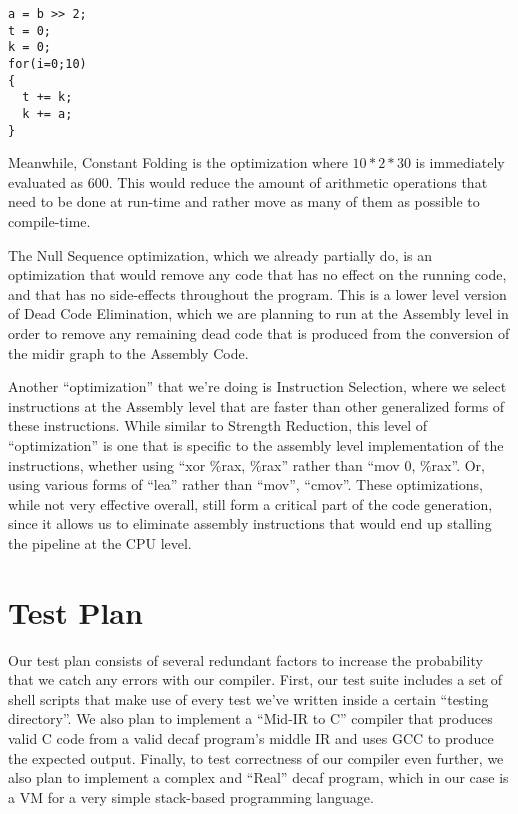 \documentclass[11pt]{article}
\begin{document}
\begin{verbatim}
a = b >> 2;
t = 0;
k = 0;
for(i=0;10)
{
  t += k;
  k += a;
}
\end{verbatim}

Meanwhile, Constant Folding is the optimization where $10*2*30$ is
immediately evaluated as $600$. This would reduce the amount of
arithmetic operations that need to be done at run-time and rather move
as many of them as possible to compile-time.

The Null Sequence optimization, which we already partially do, is an
optimization that would remove any code that has no effect on the
running code, and that has no side-effects throughout the
program. This is a lower level version of Dead Code Elimination, which
we are planning to run at the Assembly level in order to remove any
remaining dead code that is produced from the conversion of the midir
graph to the Assembly Code.

Another ``optimization'' that we're doing is Instruction Selection,
where we select instructions at the Assembly level that are faster
than other generalized forms of these instructions. While similar to
Strength Reduction, this level of ``optimization'' is one that is
specific to the assembly level implementation of the instructions,
whether using ``xor \%rax, \%rax'' rather than ``mov 0, \%rax''. Or,
using various forms of ``lea'' rather than ``mov'', ``cmov''.  These
optimizations, while not very effective overall, still form a critical
part of the code generation, since it allows us to eliminate assembly
instructions that would end up stalling the pipeline at the CPU level.

\section {Test Plan}
\label{sec:test}

Our test plan consists of several redundant factors to increase the
probability that we catch any errors with our compiler. First, our
test suite includes a set of shell scripts that make use of every test
we've written inside a certain ``testing directory''. We also plan to
implement a ``Mid-IR to C'' compiler that produces valid C code from a
valid decaf program's middle IR and uses GCC to produce the expected
output. Finally, to test correctness of our compiler even further, we
also plan to implement a complex and ``Real'' decaf program, which in
our case is a VM for a very simple stack-based programming language.
\end{document}
